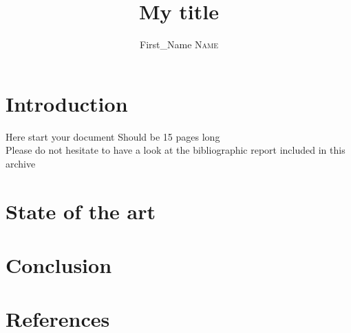 \documentclass[11pt]{sdm}
\title{My title}
\author{First\_Name \textsc{Name}}
\begin{document}
\maketitle


\section{Introduction}

Here start your document  Should be 15 pages long \\

Please do not hesitate to have a look at the bibliographic report included in this archive 

\section{State of the art}

\section{Conclusion}

\section*{References}
\end{document}
